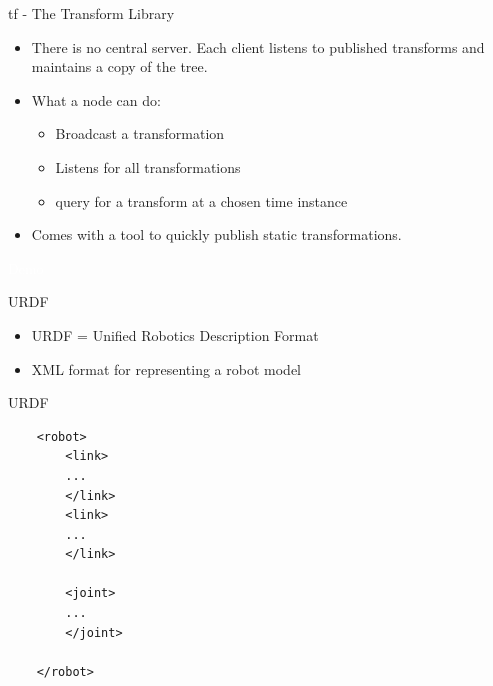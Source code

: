 \documentclass{beamer}
\begin{document}
\begin{frame}{tf - The Transform Library} 
	\subtitle{Coordinate Frames}

	\begin{itemize}
		\item There is no central server. Each client listens to published transforms and maintains a copy of the tree.
		\vspace{0.5cm}
		\item What a node can do:
		\begin{itemize}
			\item Broadcast a transformation
			\item Listens for all transformations
			\item query for a transform at a chosen time instance
		\end{itemize} 
		\vspace{0.5cm}
		\item Comes with a tool to quickly publish static transformations.
	\end{itemize}
\end{frame}

\begin{frame}[plain]{}  
	\centering
	{\huge \textcolor{white}{Demo} }
\end{frame}


\begin{frame}{URDF} 
	\begin{itemize}
		\item URDF = Unified Robotics Description Format
		\vspace{0.5cm}
		\item XML format for representing a robot model
	\end{itemize}
\end{frame}


\begin{frame}[fragile]{URDF}
	\begin{lstlisting}
	<robot>
		<link>
		...
		</link>
		<link>
		...
		</link>
		
		<joint>
		...
		</joint>
		
	</robot>
	\end{lstlisting}
\end{frame}
\end{document}
